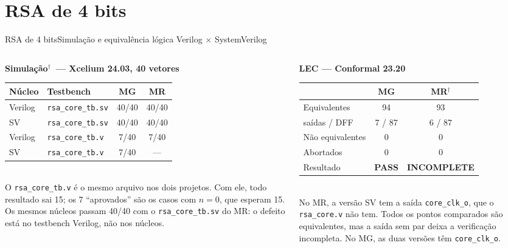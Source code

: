 \documentclass[aspectratio=169,10pt,t]{beamer}
\newcommand{\rex}{$^{\dagger}$}
\newcommand{\MG}{\textbf{\color{tmCafe}MG}}
\newcommand{\MR}{\textbf{\color{tmVermelho}MR}}
\begin{document}
\section{RSA de 4 bits}
\begin{frame}{RSA de 4 bits}{Simulação e equivalência lógica Verilog $\times$ SystemVerilog}
  \begin{columns}[T]
    \begin{column}{0.52\textwidth}
      \scriptsize
      \textbf{\color{tmCafe}Simulação\rex\ — Xcelium 24.03, 40 vetores}\\[0.1cm]
      \begin{tabular}{@{}llcc@{}}
        \toprule
        Núcleo & Testbench & \MG & \MR \\
        \midrule
        Verilog & \texttt{rsa\_core\_tb.sv} & 40/40 & 40/40 \\
        SV      & \texttt{rsa\_core\_tb.sv} & 40/40 & 40/40 \\
        Verilog & \texttt{rsa\_core\_tb.v}  & \alert{7/40} & \alert{7/40} \\
        SV      & \texttt{rsa\_core\_tb.v}  & \alert{7/40} & — \\
        \bottomrule
      \end{tabular}\\[0.15cm]
      {\tiny O \texttt{rsa\_core\_tb.v} é o mesmo arquivo nos dois projetos. Com ele, todo resultado sai 15; os 7 ``aprovados'' são os casos com $n = 0$, que esperam 15. Os mesmos núcleos passam 40/40 com o \texttt{rsa\_core\_tb.sv} do MR: o defeito está no testbench Verilog, não nos núcleos.}
    \end{column}
    \begin{column}{0.45\textwidth}
      \scriptsize
      \textbf{\color{tmCafe}LEC — Conformal 23.20}\\[0.1cm]
      \begin{tabular}{@{}lcc@{}}
        \toprule
         & \MG & \MR\rex \\
        \midrule
        Equivalentes & 94 & 93 \\
        \quad saídas / DFF & 7 / 87 & 6 / 87 \\
        Não equivalentes & 0 & 0 \\
        Abortados & 0 & 0 \\
        Resultado & \textbf{\color{tmOliva}PASS} & \textbf{\color{tmDourado}INCOMPLETE} \\
        \bottomrule
      \end{tabular}\\[0.15cm]
      {\tiny No MR, a versão SV tem a saída \texttt{core\_clk\_o}, que o \texttt{rsa\_core.v} não tem. Todos os pontos comparados são equivalentes, mas a saída sem par deixa a verificação incompleta. No MG, as duas versões têm \texttt{core\_clk\_o}.}
    \end{column}
  \end{columns}
\end{frame}
\end{document}
